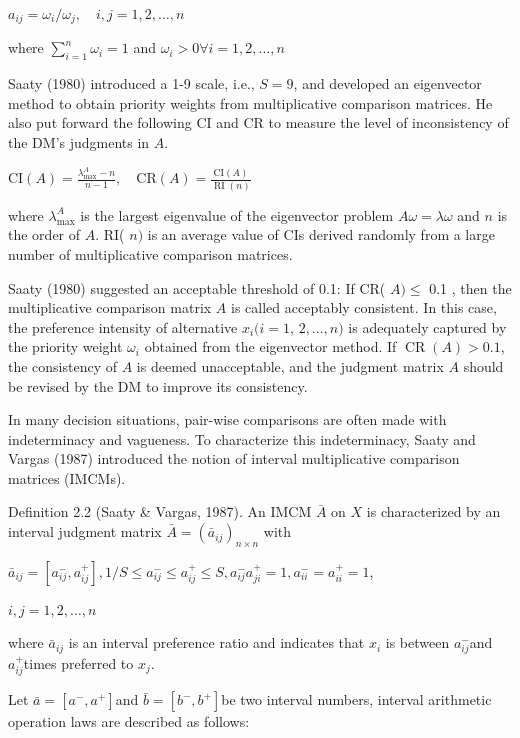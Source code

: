 \documentclass[10pt]{article}
\begin{document}
$a_{i j}=\omega_{i} / \omega_{j}, \quad i, j=1,2, \ldots, n$

where $\sum_{i=1}^{n} \omega_{i}=1$ and $\omega_{i}>0 \forall i=1,2, \ldots, n$

Saaty (1980) introduced a 1-9 scale, i.e., $S=9$, and developed an eigenvector method to obtain priority weights from multiplicative comparison matrices. He also put forward the following CI and CR to measure the level of inconsistency of the DM's judgments in $A$.

$\mathrm{CI}(A)=\frac{\lambda_{\max }^{A}-n}{n-1}, \quad \mathrm{CR}(A)=\frac{\mathrm{CI}(A)}{\operatorname{RI}(n)}$

where $\lambda_{\max }^{A}$ is the largest eigenvalue of the eigenvector problem $A \omega=\lambda \omega$ and $n$ is the order of $A$. RI( $n)$ is an average value of CIs derived randomly from a large number of multiplicative comparison matrices.

Saaty (1980) suggested an acceptable threshold of 0.1: If CR( $A) \leq$ 0.1 , then the multiplicative comparison matrix $A$ is called acceptably consistent. In this case, the preference intensity of alternative $x_{i}(i=1$, $2, \ldots, n)$ is adequately captured by the priority weight $\omega_{i}$ obtained from the eigenvector method. If $\operatorname{CR}(A)>0.1$, the consistency of $A$ is deemed unacceptable, and the judgment matrix $A$ should be revised by the DM to improve its consistency.

In many decision situations, pair-wise comparisons are often made with indeterminacy and vagueness. To characterize this indeterminacy, Saaty and Vargas (1987) introduced the notion of interval multiplicative comparison matrices (IMCMs).

Definition 2.2 (Saaty \& Vargas, 1987). An IMCM $\bar{A}$ on $X$ is characterized by an interval judgment matrix $\bar{A}=\left(\bar{a}_{i j}\right)_{n \times n}$ with

$\bar{a}_{i j}=\left[a_{i j}^{-}, a_{i j}^{+}\right], 1 / S \leq a_{i j}^{-} \leq a_{i j}^{+} \leq S, a_{i j}^{-} a_{j i}^{+}=1, a_{i i}^{-}=a_{i i}^{+}=1$,

$i, j=1,2, \ldots, n$

where $\bar{a}_{i j}$ is an interval preference ratio and indicates that $x_{i}$ is between $a_{i j}^{-}$and $a_{i j}^{+}$times preferred to $x_{j}$.

Let $\bar{a}=\left[a^{-}, a^{+}\right]$and $\bar{b}=\left[b^{-}, b^{+}\right]$be two interval numbers, interval arithmetic operation laws are described as follows:
\end{document}
